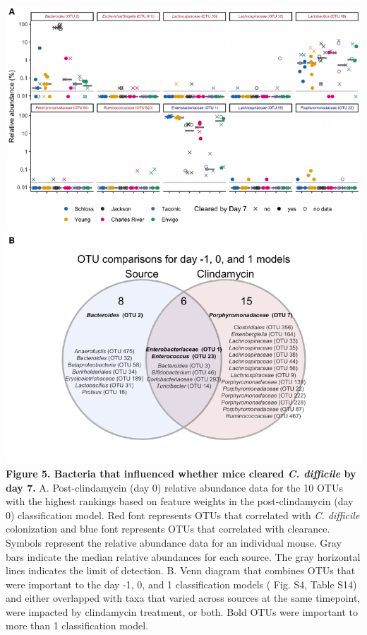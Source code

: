 \documentclass[
  11pt,
]{article}
\begin{document}
\newpage

\includegraphics{figure_5.pdf} \textbf{Figure 5. Bacteria that
influenced whether mice cleared \emph{C. difficile} by day 7.} A.
Post-clindamycin (day 0) relative abundance data for the 10 OTUs with
the highest rankings based on feature weights in the post-clindamycin
(day 0) classification model. Red font represents OTUs that correlated
with \emph{C. difficile} colonization and blue font represents OTUs that
correlated with clearance. Symbols represent the relative abundance data
for an individual mouse. Gray bars indicate the median relative
abundances for each source. The gray horizontal lines indicates the
limit of detection. B. Venn diagram that combines OTUs that were
important to the day -1, 0, and 1 classification models ( Fig. S4, Table
S14) and either overlapped with taxa that varied across sources at the
same timepoint, were impacted by clindamycin treatment, or both. Bold
OTUs were important to more than 1 classification model.

\newpage
\end{document}

